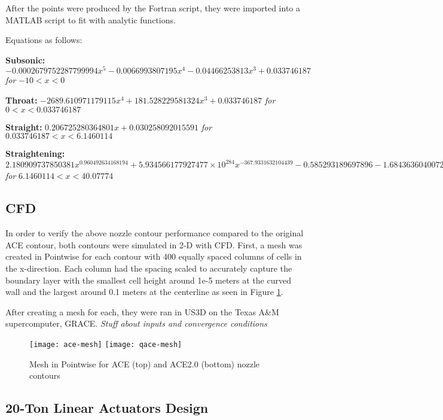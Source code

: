 After the points were produced by the Fortran script, they were imported into a MATLAB script to fit with analytic functions. 

Equations as follows:

\textbf{Subsonic:} $-0.0002679752287799994x^5 - 0.0066993807195x^4 - 0.04466253813x^3 + 0.033746187$ \textit{for} $-10 < x < 0$

\textbf{Throat:} $-2689.610971179115x^4 + 181.528229581324x^3 + 0.033746187$ \textit{for} $0 < x < 0.033746187$

\textbf{Straight:} $0.206725280364801x + 0.030258092015591$ \textit{for} $0.033746187 < x < 6.1460114$

\textbf{Straightening:} $2.180909737850381x^{0.960492634168194} + 5.934566177927477 \times 10^{284} x^{-367.9331632104439} - 0.585293189697896 - 1.684363604007221x^{1.011336503949665} - 0.023814395465567 \ln(0.418646933043039x)$ \textit{for} $6.1460114 < x < 40.07774$

\subsection{CFD}

In order to verify the above nozzle contour performance compared to the original ACE contour, both contours were simulated in 2-D with CFD. First, a mesh was created in Pointwise for each contour with 400 equally spaced columns of cells in the x-direction. Each column had the spacing scaled to accurately capture the boundary layer with the smallest cell height around 1e-5 meters at the curved wall and the largest around 0.1 meters at the centerline as seen in Figure \ref{fig:mesh}.

After creating a mesh for each, they were ran in US3D on the Texas A\&M supercomputer, GRACE. \textit{Stuff about inputs and convergence conditions}

\begin{figure}[ht]
    \centering
    \texttt{[image: ace-mesh]}
    \texttt{[image: qace-mesh]}
    \caption{Mesh in Pointwise for ACE (top) and ACE2.0 (bottom) nozzle contours}
    \label{fig:mesh}
\end{figure}

\subsection{20-Ton Linear Actuators Design}

